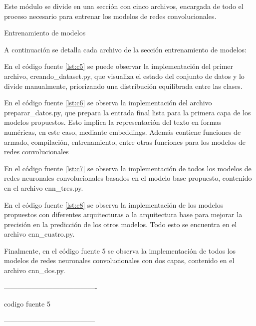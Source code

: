 Este módulo se divide en una sección con cinco archivos, encargada de todo el proceso necesario para entrenar los modelos de redes convolucionales.

Entrenamiento de modelos

A continuación se detalla cada archivo de la sección entrenamiento de modelos:

En el código fuente \ref{lst:c5} se puede observar la implementación del primer archivo, creando\_dataset.py, que visualiza el estado del conjunto de datos y lo divide manualmente, priorizando una distribución equilibrada entre las clases.



En el código fuente \ref{lst:c6} se observa la implementación del archivo preparar\_datos.py, que prepara la entrada final lista para la primera capa de los modelos propuestos. Esto implica la representación del texto en formas numéricas, en este caso, mediante embeddings. Además contiene funciones de armado, compilación, entrenamiento, entre otras funciones para los modelos de redes convolucionales



En el código fuente \ref{lst:c7} se observa la implementación de todos los modelos de redes neuronales convolucionales basados en el modelo base propuesto, contenido en el archivo cnn\_tres.py.



En el código fuente \ref{lst:c8} se observa la implementación de los modelos propuestos con diferentes arquitecturas a la arquitectura base para mejorar la precisión en la predicción de los otros modelos. Todo esto se encuentra en el archivo cnn\_cuatro.py.



Finalmente, en el código fuente 5 se observa la implementación de todos los modelos de redes neuronales convolucionales con dos capas, contenido en el archivo cnn\_dos.py.

----------------------------------------

codigo fuente 5

---------------------------------------
